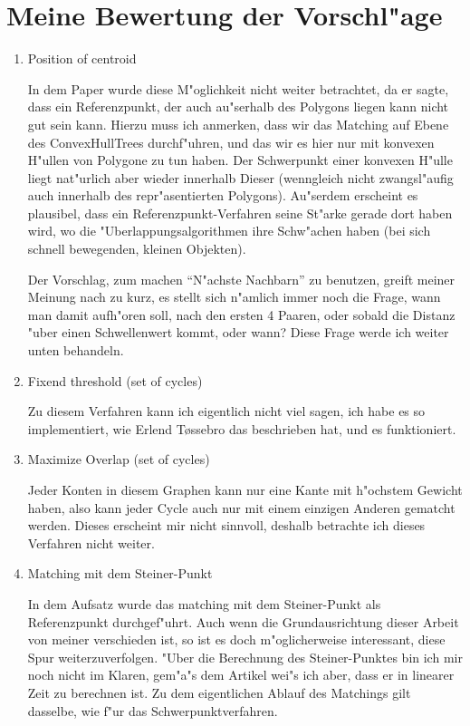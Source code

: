 \documentclass[a4paper,11pt]{scrreprt}
\begin{document}
\section{Meine Bewertung der Vorschl"age}
\begin{enumerate}
\item Position of centroid

In dem Paper wurde diese M"oglichkeit nicht weiter betrachtet, da er sagte, dass ein Referenzpunkt, der auch au"serhalb des Polygons liegen kann nicht gut sein kann. Hierzu muss ich anmerken, dass wir das Matching auf Ebene des ConvexHullTrees durchf"uhren, und das wir es hier nur mit konvexen H"ullen von Polygone zu tun haben. Der Schwerpunkt einer konvexen H"ulle liegt nat"urlich aber wieder innerhalb Dieser (wenngleich nicht zwangsl"aufig auch innerhalb des repr"asentierten Polygons). Au"serdem erscheint es plausibel, dass ein Referenzpunkt-Verfahren seine St"arke gerade dort haben wird, wo die "Uberlappungsalgorithmen ihre Schw"achen haben (bei sich schnell bewegenden, kleinen Objekten).

Der Vorschlag, zum machen "`N"achste Nachbarn"' zu benutzen, greift meiner Meinung nach zu kurz, es stellt sich n"amlich immer noch die Frage, wann man damit aufh"oren soll, nach den ersten 4 Paaren, oder sobald die Distanz "uber einen Schwellenwert kommt, oder wann? Diese Frage werde ich weiter unten behandeln.

\item Fixend threshold (set of cycles)

Zu diesem Verfahren kann ich eigentlich nicht viel sagen, ich habe es so implementiert, wie Erlend T\o{}ssebro das beschrieben hat, und es funktioniert.

\item Maximize Overlap (set of cycles)

Jeder Konten in diesem Graphen kann nur eine Kante mit h"ochstem Gewicht haben, also kann jeder Cycle auch nur mit einem einzigen Anderen gematcht werden. Dieses erscheint mir nicht sinnvoll, deshalb betrachte ich dieses Verfahren nicht weiter.

\item Matching mit dem Steiner-Punkt

In dem Aufsatz \cite{AAR} wurde das matching mit dem Steiner-Punkt als Referenzpunkt durchgef"uhrt. Auch wenn die Grundausrichtung dieser Arbeit von meiner verschieden ist, so ist es doch m"oglicherweise interessant, diese Spur weiterzuverfolgen. "Uber die Berechnung des Steiner-Punktes bin ich mir noch nicht im Klaren, gem"a"s dem Artikel wei"s ich aber, dass er in linearer Zeit zu berechnen ist. Zu dem eigentlichen Ablauf des Matchings gilt dasselbe, wie f"ur das Schwerpunktverfahren.
\end{enumerate}
\end{document}
